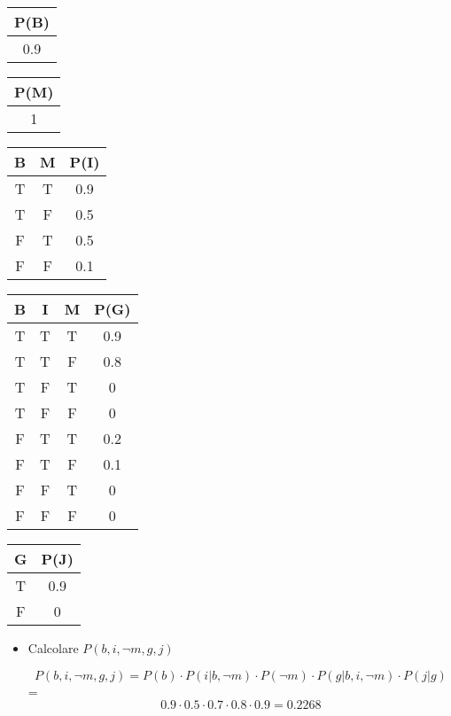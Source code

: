\documentclass{article}
\begin{document}
\begin{minipage}{4cm}
	\begin{tabular}{|c|}
		\hline
		P(B) \\ \hline
		0.9  \\ \hline
	\end{tabular}
\end{minipage}
\begin{minipage}{4cm}
	\begin{tabular}{|c|}
		\hline
		P(M) \\ \hline
		1    \\ \hline
	\end{tabular}
\end{minipage}
\begin{minipage}{4cm}
	\begin{tabular}{|c|c|c|}
		\hline
		B & M & P(I) \\ \hline
		T & T & 0.9  \\ \hline
		T & F & 0.5  \\ \hline
		F & T & 0.5  \\ \hline
		F & F & 0.1  \\ \hline
	\end{tabular}
\end{minipage}
\begin{minipage}{4cm}
	\begin{tabular}{|c|c|c|c|}
		\hline
		B & I & M & P(G) \\ \hline
		T & T & T & 0.9  \\ \hline
		T & T & F & 0.8  \\ \hline
		T & F & T & 0    \\ \hline
		T & F & F & 0    \\ \hline
		F & T & T & 0.2  \\ \hline
		F & T & F & 0.1  \\ \hline
		F & F & T & 0    \\ \hline
		F & F & F & 0    \\ \hline
	\end{tabular}
\end{minipage}
\begin{tabular}{|c|c|}
	\hline
	G & P(J) \\ \hline
	T & 0.9  \\ \hline
	F & 0    \\ \hline
\end{tabular}

\begin{itemize}
	\item Calcolare \(P(b,i, \neg m, g, j)\)
	
	\[
	    P(b,i, \neg m, g, j) = P(b) \cdot P(i | b, \neg m) \cdot P(\neg m) \cdot P(g | b, i, \neg m) \cdot P(j | g)
	\] = 
		\[
	0.9 \cdot 0.5 \cdot 0.7 \cdot 0.8 \cdot 0.9 = 0.2268
	\]
\end{itemize}
\end{document}
